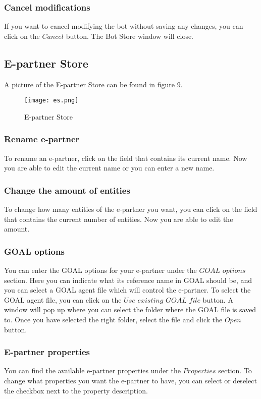 \documentclass[11pt,a4paper]{article}
\begin{document}
\subsubsection{Cancel modifications}
If you want to cancel modifying the bot without saving any changes, you can click on the $Cancel$ button. The Bot Store window will close.

\subsection{E-partner Store}
A picture of the E-partner Store can be found in figure 9.
\begin{figure}[h]
\begin{center}
\texttt{[image: es.png]}
\end{center}
\caption{E-partner Store}
\end{figure}
\subsubsection{Rename e-partner}
To rename an e-partner, click on the field that contains its current name. Now you are able to edit the current name or you can enter a new name.

\subsubsection{Change the amount of entities}
To change how many entities of the e-partner you want, you can click on the field that contains the current number of entities. Now you are able to edit the amount.

\subsubsection{GOAL options}
You can enter the GOAL options for your e-partner under the $GOAL$ $options$ section. Here you can indicate what its reference name in GOAL should be, and you can select a GOAL agent file which will control the e-partner. To select the GOAL agent file, you can click on the $Use$ $existing$ $GOAL$ $file$ button. A window will pop up where you can select the folder where the GOAL file is saved to. Once you have selected the right folder, select the file and click the $Open$ button.

\subsubsection{E-partner properties}
You can find the available e-partner properties under the $Properties$ section. To change what properties you want the e-partner to have, you can select or deselect the checkbox next to the property description.
\end{document}
